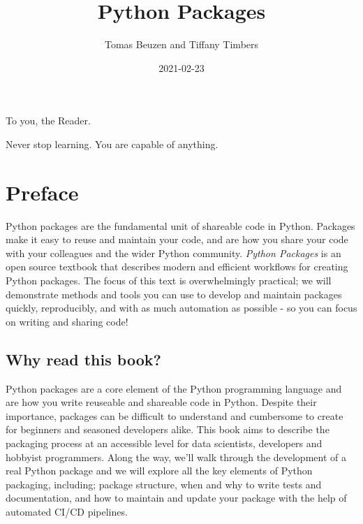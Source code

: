 \documentclass[
]{krantz}
\title{Python Packages}
\author{Tomas Beuzen and Tiffany Timbers}
\date{2021-02-23}
\begin{document}
\maketitle


\thispagestyle{empty}

\begin{center}
To you, the Reader.

Never stop learning. You are capable of anything.
\end{center}

\setlength{\abovedisplayskip}{-5pt}
\setlength{\abovedisplayshortskip}{-5pt}

{
\hypersetup{linkcolor=}
\setcounter{tocdepth}{2}
\tableofcontents
}
\listoftables
\listoffigures
\hypertarget{preface}{%
\chapter*{Preface}\label{preface}}


Python packages are the fundamental unit of shareable code in Python. Packages make it easy to reuse and maintain your code, and are how you share your code with your colleagues and the wider Python community. \emph{Python Packages} is an open source textbook that describes modern and efficient workflows for creating Python packages. The focus of this text is overwhelmingly practical; we will demonstrate methods and tools you can use to develop and maintain packages quickly, reproducibly, and with as much automation as possible - so you can focus on writing and sharing code!

\hypertarget{why-read-this-book}{%
\section*{Why read this book?}\label{why-read-this-book}}


Python packages are a core element of the Python programming language and are how you write reuseable and shareable code in Python. Despite their importance, packages can be difficult to understand and cumbersome to create for beginners and seasoned developers alike. This book aims to describe the packaging process at an accessible level for data scientists, developers and hobbyist programmers. Along the way, we'll walk through the development of a real Python package and we will explore all the key elements of Python packaging, including; package structure, when and why to write tests and documentation, and how to maintain and update your package with the help of automated CI/CD pipelines.
\end{document}
